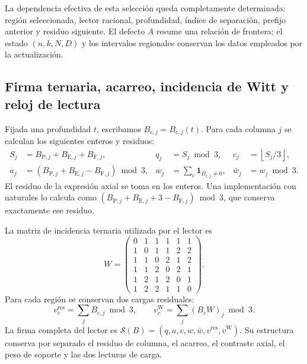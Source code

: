La dependencia efectiva de esta selección queda completamente determinada:
región seleccionada, lector racional, profundidad, índice de separación,
prefijo anterior y residuo siguiente. El defecto \(A\) resume una relación
de frontera; el estado \((n,k,N,D)\) y los intervalos regionales conservan
los datos empleados por la actualización.

\subsection{Firma ternaria, acarreo, incidencia de Witt y reloj de lectura}
\label{act21:subsec:df-firma-conjunta}


Fijada una profundidad \(t\), escribamos \(B_{c,j}=B_{c,j}(t)\). Para
cada columna \(j\) se calculan los siguientes enteros y residuos:
\begin{align}
 S_j&=B_{\mathrm P,j}+B_{\mathrm E,j}+B_{\mathrm F,j},
 &q_j&=S_j\bmod3,
 &c_j&=\left\lfloor S_j/3\right\rfloor,
 \label{act21:eq:df-firma-qc}\\
 a_j&=(B_{\mathrm P,j}+B_{\mathrm E,j}-B_{\mathrm F,j})\bmod3,
 &w_j&=\sum_c\mathbf1_{B_{c,j}\ne0},
 &\bar w_j&=w_j\bmod3.
 \label{act21:eq:df-firma-axial}
\end{align}
El residuo de la expresión axial se toma en los enteros. Una implementación
con naturales lo calcula como
\((B_{\mathrm P,j}+B_{\mathrm E,j}+3-B_{\mathrm F,j})\bmod3\), que conserva
exactamente ese residuo.

La matriz de incidencia ternaria utilizada por el lector es
\begin{equation}
 W=\begin{pmatrix}
0&1&1&1&1&1\\
1&0&1&1&2&2\\
1&1&0&2&1&2\\
1&1&2&0&2&1\\
1&2&1&2&0&1\\
1&2&2&1&1&0
\end{pmatrix}.
\label{act21:eq:df-matriz-witt}
\end{equation}
Para cada región se conservan dos cargas residuales:
\begin{equation}
 v_c^{\mathrm{res}}=\sum_j B_{c,j}\bmod3,
 \qquad
 v_c^{\mathrm W}=\sum_j(B_cW)_j\bmod3.
 \label{act21:eq:df-cargas-residuales}
\end{equation}
La firma completa del lector es
\(\mathcal S(B)=(q,a,c,w,\bar w,v^{\mathrm{res}},v^{\mathrm W})\).
Su estructura conserva por separado el residuo de columna, el acarreo, el
contraste axial, el peso de soporte y las dos lecturas de carga.

